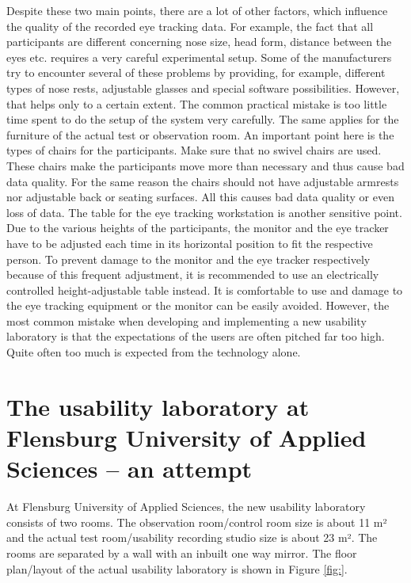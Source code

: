 \begin{
}[h]
\begin{styleBodyTextIndent}
Despite these two main points, there are a lot of other factors, which influence the quality of the recorded eye tracking data. For example, the fact that all participants are different concerning nose size, head form, distance between the eyes etc. requires a very careful experimental setup. Some of the manufacturers try to encounter several of these problems by providing, for example, different types of nose rests, adjustable glasses and special software possibilities. However, that helps only to a certain extent. The common practical mistake is too little time spent to do the setup of the system very carefully. The same applies for the furniture of the actual test or observation room. An important point here is the types of chairs for the participants. Make sure that no swivel chairs are used. These chairs make the participants move more than necessary and thus cause bad data quality. For the same reason the chairs should not have adjustable armrests nor adjustable back or seating surfaces. All this causes bad data quality or even loss of data. The table for the eye tracking workstation is another sensitive point. Due to the various heights of the participants, the monitor and the eye tracker have to be adjusted each time in its horizontal position to fit the respective person. To prevent damage to the monitor and the eye tracker respectively because of this frequent adjustment, it is recommended to use an electrically controlled height-adjustable table instead. It is comfortable to use and damage to the eye tracking equipment or the monitor can be easily avoided. However, the most common mistake when developing and implementing a new usability laboratory is that the expectations of the users are often pitched far too high. Quite often too much is expected from the technology alone. 
\end{styleBodyTextIndent}

\section{The usability laboratory at Flensburg University of Applied Sciences – an attempt }

At Flensburg University of Applied Sciences, the new usability laboratory consists of two rooms. The observation room/control room size is about 11 m² and the actual test room/usability recording studio size is about 23 m². The rooms are separated by a wall with an inbuilt one way mirror. The floor plan/layout of the actual usability laboratory is shown in Figure \ref{fig:}. 


\end{
}

